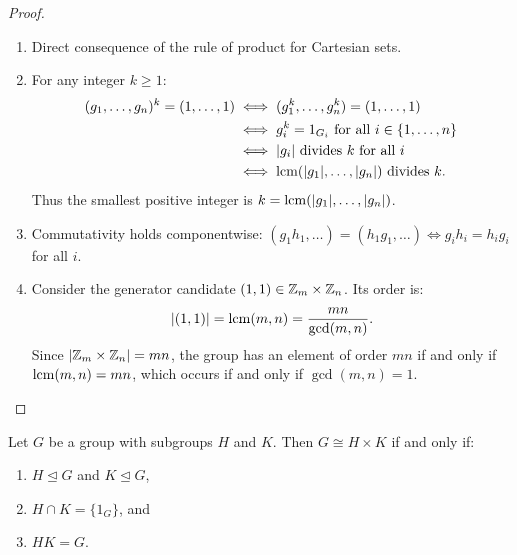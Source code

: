 \begin{proof}
\begin{enumerate}[label=\textbf{(\roman*)}, leftmargin=*, itemsep=6pt]
    \item Direct consequence of the rule of product for Cartesian sets.
    \item For any integer $k \ge 1$:
    \begin{align*}
    (g_1, \dots, g_n)^k = (1, \dots, 1) 
    &\iff (g_1^k, \dots, g_n^k) = (1, \dots, 1) \\
    &\iff g_i^k = 1_{G_i} \text{ for all } i \in \{1, \dots, n\} \\
    &\iff |g_i| \text{ divides } k \text{ for all } i \\
    &\iff \operatorname{lcm}(|g_1|, \dots, |g_n|) \text{ divides } k.
    \end{align*}
    Thus the smallest positive integer is $k = \operatorname{lcm}(|g_1|, \dots, |g_n|)$.

    \item Commutativity holds componentwise: $(g_1 h_1, \dots) = (h_1 g_1, \dots) \iff g_i h_i = h_i g_i$ for all $i$.

    \item Consider the generator candidate $(1, 1) \in \mathbb{Z}_m \times \mathbb{Z}_n$. Its order is:
    \begin{equation*}
    |(1, 1)| = \operatorname{lcm}(m, n) = \frac{mn}{\gcd(m, n)}.
    \end{equation*}
    Since $|\mathbb{Z}_m \times \mathbb{Z}_n| = mn$, the group has an element of order $mn$ if and only if $\operatorname{lcm}(m, n) = mn$, which occurs if and only if $\gcd(m, n) = 1$.
\end{enumerate}
\end{proof}

\begin{theorem}
\label{thm:internal_direct_product}
Let $G$ be a group with subgroups $H$ and $K$. Then $G \cong H \times K$ if and only if:
\begin{enumerate}[label=\textbf{(\arabic*)}, leftmargin=*, itemsep=4pt]
    \item $H \trianglelefteq G$ and $K \trianglelefteq G$,
    \item $H \cap K = \{ 1_G \}$, and
    \item $HK = G$.
\end{enumerate}
\end{theorem}

